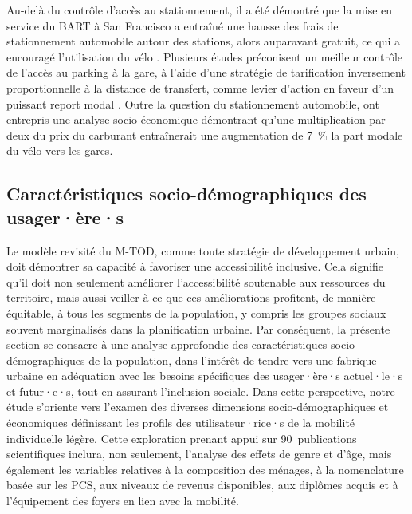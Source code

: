 \begin{refsegment}
Au-delà du contrôle d'accès au stationnement, il a été démontré que la mise en service du BART à San Francisco a entraîné une hausse des frais de stationnement automobile autour des stations, alors auparavant gratuit, ce qui a encouragé l'utilisation du vélo \textcolor{blue}{\autocite[94]{cervero_bike-and-ride_2013}}. Plusieurs études préconisent un meilleur contrôle de l'accès au parking à la gare, à l'aide d'une stratégie de tarification inversement proportionnelle à la distance de transfert, comme levier d'action en faveur d'un puissant report modal \textcolor{blue}{\autocite[751]{midenet_modal_2018}}. Outre la question du stationnement automobile, \textcolor{blue}{\textcite[2737]{papon_evaluation_2017}} ont entrepris une analyse socio-économique démontrant qu'une multiplication par deux du prix du carburant entraînerait une augmentation de 7~\% la part modale du vélo vers les gares.%

\subsection{Caractéristiques socio-démographiques des usager·ère·s
    \label{chap2:sociodemographie-usagers}
    }
    
Le modèle revisité du \acrshort{M-TOD}, comme toute stratégie de développement urbain, doit démontrer sa capacité à favoriser une accessibilité inclusive. Cela signifie qu'il doit non seulement améliorer l'accessibilité soutenable aux ressources du territoire, mais aussi veiller à ce que ces améliorations profitent, de manière équitable, à tous les segments de la population, y compris les groupes sociaux souvent marginalisés dans la planification urbaine. Par conséquent, la présente section se consacre à une analyse approfondie des caractéristiques socio-démographiques de la population, dans l'intérêt de tendre vers une fabrique urbaine en adéquation avec les besoins spécifiques des usager·ère·s actuel·le·s et futur·e·s, tout en assurant l'inclusion sociale. Dans cette perspective, notre étude s'oriente vers l'examen des diverses dimensions socio-démographiques et économiques définissant les profils des utilisateur·rice·s de la mobilité individuelle légère. Cette exploration prenant appui sur 90~publications scientifiques inclura, non seulement, l'analyse des effets de genre et d'âge, mais également les variables relatives à la composition des ménages, à la nomenclature basée sur les \acrshort{PCS}, aux niveaux de revenus disponibles, aux diplômes acquis et à l'équipement des foyers en lien avec la mobilité.%


\end{refsegment}
